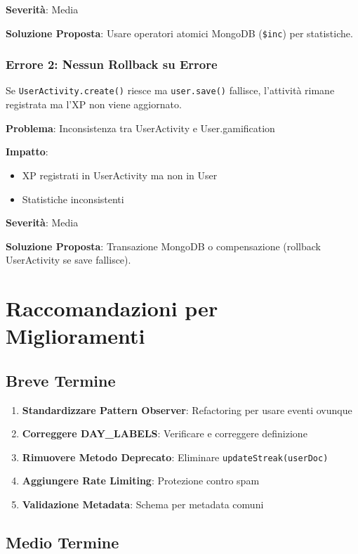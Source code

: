 \documentclass[11pt,a4paper]{article}
\begin{document}
\textbf{Severità}: Media

\textbf{Soluzione Proposta}: Usare operatori atomici MongoDB (\texttt{\$inc}) per statistiche.

\subsubsection{Errore 2: Nessun Rollback su Errore}

Se \texttt{UserActivity.create()} riesce ma \texttt{user.save()} fallisce, l'attività rimane registrata ma l'XP non viene aggiornato.

\textbf{Problema}: Inconsistenza tra UserActivity e User.gamification

\textbf{Impatto}: 
\begin{itemize}
    \item XP registrati in UserActivity ma non in User
    \item Statistiche inconsistenti
\end{itemize}

\textbf{Severità}: Media

\textbf{Soluzione Proposta}: Transazione MongoDB o compensazione (rollback UserActivity se save fallisce).

\section{Raccomandazioni per Miglioramenti}

\subsection{Breve Termine}

\begin{enumerate}
    \item \textbf{Standardizzare Pattern Observer}: Refactoring per usare eventi ovunque
    \item \textbf{Correggere DAY\_LABELS}: Verificare e correggere definizione
    \item \textbf{Rimuovere Metodo Deprecato}: Eliminare \texttt{updateStreak(userDoc)}
    \item \textbf{Aggiungere Rate Limiting}: Protezione contro spam
    \item \textbf{Validazione Metadata}: Schema per metadata comuni
\end{enumerate}

\subsection{Medio Termine}
\end{document}
